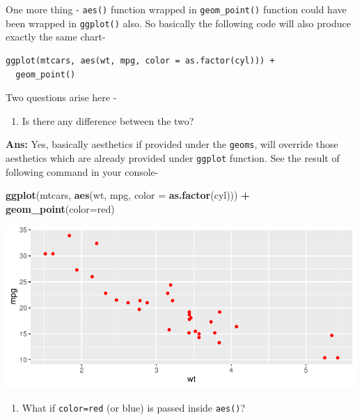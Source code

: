 \documentclass[
]{book}
\newenvironment{Shaded}{\begin{snugshade}}{\end{snugshade}}
\newcommand{\AttributeTok}[1]{\textcolor[rgb]{0.13,0.29,0.53}{#1}}
\newcommand{\FunctionTok}[1]{\textcolor[rgb]{0.13,0.29,0.53}{\textbf{#1}}}
\newcommand{\NormalTok}[1]{#1}
\newcommand{\SpecialCharTok}[1]{\textcolor[rgb]{0.81,0.36,0.00}{\textbf{#1}}}
\newcommand{\StringTok}[1]{\textcolor[rgb]{0.31,0.60,0.02}{#1}}
\providecommand{\tightlist}{%
  \setlength{\itemsep}{0pt}\setlength{\parskip}{0pt}}
\begin{document}
One more thing - \texttt{aes()} function wrapped in \texttt{geom\_point()} function could have been wrapped in \texttt{ggplot()} also. So basically the following code will also produce exactly the same chart-

\begin{verbatim}
ggplot(mtcars, aes(wt, mpg, color = as.factor(cyl))) +
  geom_point()
\end{verbatim}

Two questions arise here -

\begin{enumerate}
\def\labelenumi{\arabic{enumi}.}
\tightlist
\item
  Is there any difference between the two?
\end{enumerate}

\textbf{Ans:} Yes, basically aesthetics if provided under the \texttt{geoms}, will override those aesthetics which are already provided under \texttt{ggplot} function. See the result of following command in your console-

\begin{Shaded}
\begin{Highlighting}[]
\FunctionTok{ggplot}\NormalTok{(mtcars, }\FunctionTok{aes}\NormalTok{(wt, mpg, }\AttributeTok{color =} \FunctionTok{as.factor}\NormalTok{(cyl))) }\SpecialCharTok{+}
  \FunctionTok{geom\_point}\NormalTok{(}\AttributeTok{color=}\StringTok{\textquotesingle{}red\textquotesingle{}}\NormalTok{)}
\end{Highlighting}
\end{Shaded}

\begin{center}\includegraphics{DauR_files/figure-latex/fig_8-1} \end{center}

\begin{enumerate}
\def\labelenumi{\arabic{enumi}.}
\setcounter{enumi}{1}
\tightlist
\item
  What if \texttt{color=\textquotesingle{}red\textquotesingle{}} (or blue) is passed inside \texttt{aes()}?
\end{enumerate}
\end{document}
